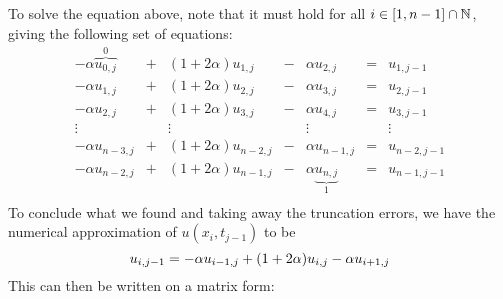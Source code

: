 \documentclass[12pt,english,a4paper]{article}
\begin{document}
To solve the equation above, note that it must hold for all \(i\in\qty[1,n-1]\cap\mathbb{N}\), giving the following set of equations:
\[
    \begin{array}{ccccccc}
        -\alpha \overbrace{u_{0,j}}^0 &+& (1+2\alpha)u_{1,j} &-& \alpha u_{2,j} &=& u_{1,j-1}\\
        -\alpha u_{1,j} &+& (1+2\alpha)u_{2,j} &-& \alpha u_{3,j} &=& u_{2,j-1}\\
        -\alpha u_{2,j} &+& (1+2\alpha)u_{3,j} &-& \alpha u_{4,j} &=& u_{3,j-1}\\
        \vdots && \vdots && \vdots && \vdots\\
        -\alpha u_{n-3,j} &+& (1+2\alpha)u_{n-2,j} &-& \alpha u_{n-1,j} &=& u_{n-2,j-1}\\
        -\alpha u_{n-2,j} &+& (1+2\alpha)u_{n-1,j} &-& \alpha \underbrace{u_{n,j}}_1 &=& u_{n-1,j-1}\\
    \end{array}
\]
To conclude what we found and taking away the truncation errors, we have the numerical approximation of \(u(x_i,t_{j-1})\) to be
\begin{equation}\label{eq:backwardEuler}
u_{i,j-1} = -\alpha u_{i-1,j} + \qty(1+2\alpha)u_{i,j} - \alpha u_{i+1,j} 
\end{equation}
This can then be written on a matrix form:
\end{document}
